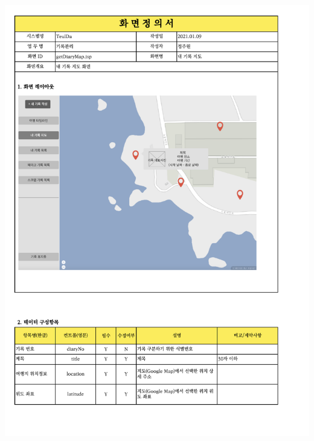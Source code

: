 {{{{{{{{{{{{{\includegraphics[width=20cm]{./Figure/Analysis/Display/diary/diary_12.pdf} \\
}}}}}}}}}}}}}
